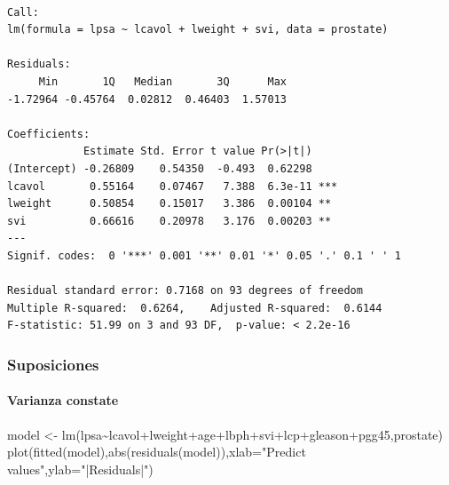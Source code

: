 \documentclass[
  letterpaper,
  DIV=11,
  numbers=noendperiod]{scrartcl}
\let\oldparagraph\paragraph
\renewcommand{\paragraph}[1]{\oldparagraph{#1}\mbox{}}
\newenvironment{Shaded}{\begin{snugshade}}{\end{snugshade}}
\newcommand{\AttributeTok}[1]{\textcolor[rgb]{0.40,0.45,0.13}{#1}}
\newcommand{\FunctionTok}[1]{\textcolor[rgb]{0.28,0.35,0.67}{#1}}
\newcommand{\NormalTok}[1]{\textcolor[rgb]{0.00,0.23,0.31}{#1}}
\newcommand{\OtherTok}[1]{\textcolor[rgb]{0.00,0.23,0.31}{#1}}
\newcommand{\SpecialCharTok}[1]{\textcolor[rgb]{0.37,0.37,0.37}{#1}}
\newcommand{\StringTok}[1]{\textcolor[rgb]{0.13,0.47,0.30}{#1}}
\begin{document}
\begin{verbatim}

Call:
lm(formula = lpsa ~ lcavol + lweight + svi, data = prostate)

Residuals:
     Min       1Q   Median       3Q      Max 
-1.72964 -0.45764  0.02812  0.46403  1.57013 

Coefficients:
            Estimate Std. Error t value Pr(>|t|)    
(Intercept) -0.26809    0.54350  -0.493  0.62298    
lcavol       0.55164    0.07467   7.388  6.3e-11 ***
lweight      0.50854    0.15017   3.386  0.00104 ** 
svi          0.66616    0.20978   3.176  0.00203 ** 
---
Signif. codes:  0 '***' 0.001 '**' 0.01 '*' 0.05 '.' 0.1 ' ' 1

Residual standard error: 0.7168 on 93 degrees of freedom
Multiple R-squared:  0.6264,    Adjusted R-squared:  0.6144 
F-statistic: 51.99 on 3 and 93 DF,  p-value: < 2.2e-16
\end{verbatim}

\hypertarget{suposiciones}{%
\subsubsection{Suposiciones}\label{suposiciones}}

\hypertarget{varianza-constate}{%
\paragraph{Varianza constate}\label{varianza-constate}}

\begin{Shaded}
\begin{Highlighting}[]
\NormalTok{model }\OtherTok{\textless{}{-}} \FunctionTok{lm}\NormalTok{(lpsa}\SpecialCharTok{\textasciitilde{}}\NormalTok{lcavol}\SpecialCharTok{+}\NormalTok{lweight}\SpecialCharTok{+}\NormalTok{age}\SpecialCharTok{+}\NormalTok{lbph}\SpecialCharTok{+}\NormalTok{svi}\SpecialCharTok{+}\NormalTok{lcp}\SpecialCharTok{+}\NormalTok{gleason}\SpecialCharTok{+}\NormalTok{pgg45,prostate)}
\FunctionTok{plot}\NormalTok{(}\FunctionTok{fitted}\NormalTok{(model),}\FunctionTok{abs}\NormalTok{(}\FunctionTok{residuals}\NormalTok{(model)),}\AttributeTok{xlab=}\StringTok{"Predict values"}\NormalTok{,}\AttributeTok{ylab=}\StringTok{"|Residuals|"}\NormalTok{)}
\end{Highlighting}
\end{Shaded}
\end{document}

